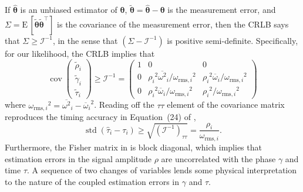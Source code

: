 \documentclass{iopart}
\DeclareMathOperator{\cov}{cov}
\DeclareMathOperator{\std}{std}
\begin{document}
If $\hat{\boldsymbol\theta}$ is an unbiased estimator of $\boldsymbol\theta$, $\tilde{\boldsymbol\theta} = \hat{\boldsymbol\theta} - \boldsymbol\theta$ is the measurement error, and $\Sigma = \mathrm{E} \, [\tilde{\boldsymbol\theta}\tilde{\boldsymbol\theta}^\intercal]$ is the covariance of the measurement error, then the \ac{CRLB} says that $\Sigma \geq \mathcal{I}^{-1}$, in the sense that $\left(\Sigma - \mathcal{I}^{-1}\right)$ is positive semi\nobreakdashes-definite. Specifically, for our likelihood, the \ac{CRLB} implies that
%
\begin{equation}\label{eq:covariance-matrix}
    \cov{
        \left(
        \begin{array}{c}
            \tilde{\rho}_i \\
            \tilde{\gamma}_i \\
            \tilde{\tau}_i
        \end{array}
        \right)
    } \geq \mathcal{I}^{-1} = \left(
        \begin{array}{ccc}
            1 & 0 & 0 \\
            0 & {\rho_i}^2 {\overline{\omega^2}}_i/{\omega_{\mathrm{rms},i}}^2 & {\rho_i}^2 {\overline{\omega}}_i/{\omega_{\mathrm{rms},i}}^2 \\
            0 & {\rho_i}^2 {\overline{\omega}}_i/{\omega_{\mathrm{rms},i}}^2 & {\rho_i}^2/{\omega_{\mathrm{rms},i}}^2
        \end{array}
    \right)
\end{equation}
%
where ${\omega_{\mathrm{rms},i}}^2 = {\overline{\omega^2}}_i - {{\overline{\omega}}_i}^2$. Reading off the $\tau \tau$ element of the covariance matrix reproduces the timing accuracy in Equation~(24) of \cite{fairhurst:2009},
%
\begin{equation}\label{eq:timing-crlb}
    \std \left(\hat{\tau}_i - \tau_i \right) \geq \sqrt{\left(\mathcal{I}^{-1}\right)_{\tau\tau}} = \frac{\rho_i}{\omega_{\mathrm{rms},i}}.
\end{equation}
%
Furthermore, the Fisher matrix in  is block diagonal, which implies that estimation errors in the signal amplitude $\rho$ are uncorrelated with the phase $\gamma$ and time $\tau$. A sequence of two changes of variables lends some physical interpretation to the nature of the coupled estimation errors in $\gamma$ and $\tau$.
\end{document}
